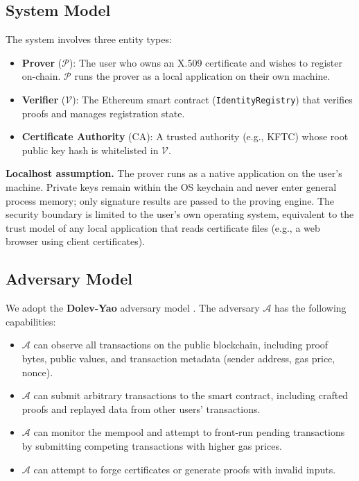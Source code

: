 \documentclass[11pt, a4paper]{article}
\providecommand{\tightlist}{%
  \setlength{\itemsep}{0pt}\setlength{\parskip}{0pt}}
\begin{document}
\subsection{System Model}\label{system-model}

The system involves three entity types:

\begin{itemize}
\tightlist
\item
  \textbf{Prover} (\(\mathcal{P}\)): The user who owns an X.509
  certificate and wishes to register on-chain. \(\mathcal{P}\) runs the
  prover as a local application on their own machine.
\item
  \textbf{Verifier} (\(\mathcal{V}\)): The Ethereum smart contract
  (\texttt{IdentityRegistry}) that verifies proofs and manages
  registration state.
\item
  \textbf{Certificate Authority} (\(\text{CA}\)): A trusted authority
  (e.g., KFTC) whose root public key hash is whitelisted in
  \(\mathcal{V}\).
\end{itemize}

\textbf{Localhost assumption.} The prover runs as a native application on the user's machine. Private keys remain within the OS keychain and never enter general process memory; only signature results are passed to the proving engine. The security boundary is limited
to the user's own operating system, equivalent to the trust model of any
local application that reads certificate files (e.g., a web browser
using client certificates).

\subsection{Adversary Model}\label{adversary-model}

We adopt the \textbf{Dolev-Yao} adversary model \cite{ref11}. The adversary
\(\mathcal{A}\) has the following capabilities:

\begin{itemize}
\tightlist
\item
  \(\mathcal{A}\) can observe all transactions on the public blockchain,
  including proof bytes, public values, and transaction metadata (sender
  address, gas price, nonce).
\item
  \(\mathcal{A}\) can submit arbitrary transactions to the smart
  contract, including crafted proofs and replayed data from other users'
  transactions.
\item
  \(\mathcal{A}\) can monitor the mempool and attempt to front-run
  pending transactions by submitting competing transactions with higher
  gas prices.
\item
  \(\mathcal{A}\) can attempt to forge certificates or generate proofs
  with invalid inputs.
\end{itemize}
\end{document}

